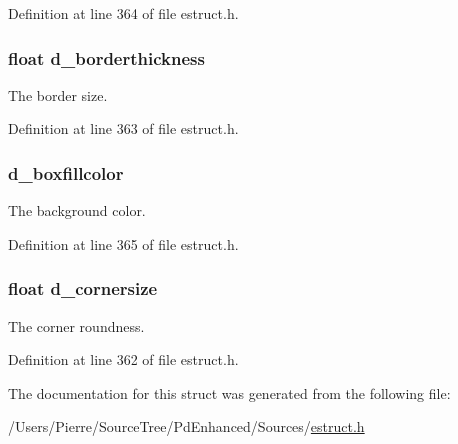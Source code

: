 Definition at line 364 of file estruct.\-h.

\hypertarget{struct__edrawparams_a9c360cb962f79a835ed0457d1dad34b5}{
\subsubsection[{d\-\_\-borderthickness}]{\setlength{\rightskip}{0pt plus 5cm}float d\-\_\-borderthickness}}\label{struct__edrawparams_a9c360cb962f79a835ed0457d1dad34b5}
The border size. 

Definition at line 363 of file estruct.\-h.

\hypertarget{struct__edrawparams_aaf0259436a4f71d6659c0447e4b98e2b}{
\subsubsection[{d\-\_\-boxfillcolor}]{ d\-\_\-boxfillcolor}}\label{struct__edrawparams_aaf0259436a4f71d6659c0447e4b98e2b}
The background color. 

Definition at line 365 of file estruct.\-h.

\hypertarget{struct__edrawparams_aabe78053b56e3bf3df55c7b85fa251b2}{
\subsubsection[{d\-\_\-cornersize}]{\setlength{\rightskip}{0pt plus 5cm}float d\-\_\-cornersize}}\label{struct__edrawparams_aabe78053b56e3bf3df55c7b85fa251b2}
The corner roundness. 

Definition at line 362 of file estruct.\-h.



The documentation for this struct was generated from the following file\-:\begin{DoxyCompactItemize}
\item 
/\-Users/\-Pierre/\-Source\-Tree/\-Pd\-Enhanced/\-Sources/\hyperlink{estruct_8h}{estruct.\-h}\end{DoxyCompactItemize}
